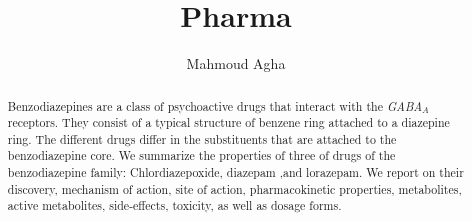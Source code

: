 \documentclass[10pt, a4paper]{report}
\author{Mahmoud Agha}
\title{Pharma}
\begin{document}
\maketitle
\tableofcontents
	\begin{abstract}
		Benzodiazepines are a class of psychoactive drugs that interact with the \emph{GABA$_A$} receptors. They consist of a typical structure of benzene ring attached to a diazepine ring. The different drugs differ in the substituents that are attached to the benzodiazepine core. We summarize the properties of three of drugs of the benzodiazepine  family: Chlordiazepoxide, diazepam ,and lorazepam. We report on their discovery, mechanism of action, site of action, pharmacokinetic properties, metabolites, active metabolites, side-effects, toxicity, as well as dosage forms. 
	\end{abstract}












 
\end{document}
